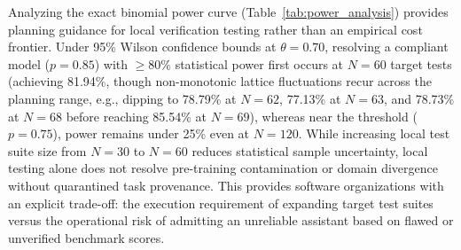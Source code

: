 \documentclass[runningheads]{llncs}
\begin{document}
Analyzing the exact binomial power curve (Table~\ref{tab:power_analysis}) provides planning guidance for local verification testing rather than an empirical cost frontier. Under 95\% Wilson confidence bounds at $\theta = 0.70$, resolving a compliant model ($p = 0.85$) with $\ge 80\%$ statistical power first occurs at $N = 60$ target tests (achieving 81.94\%, though non-monotonic lattice fluctuations recur across the planning range, e.g., dipping to 78.79\% at $N=62$, 77.13\% at $N=63$, and 78.73\% at $N=68$ before reaching 85.54\% at $N=69$), whereas near the threshold ($p = 0.75$), power remains under 25\% even at $N = 120$. While increasing local test suite size from $N = 30$ to $N = 60$ reduces statistical sample uncertainty, local testing alone does not resolve pre-training contamination or domain divergence without quarantined task provenance. This provides software organizations with an explicit trade-off: the execution requirement of expanding target test suites versus the operational risk of admitting an unreliable assistant based on flawed or unverified benchmark scores.
\end{document}
